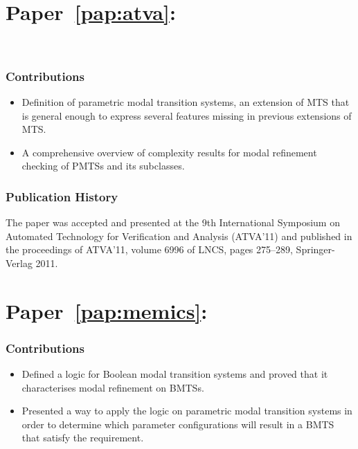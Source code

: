 \newpage

\section*{Paper~\ref{pap:atva}: \atva}
\nikola \jan \kim \\ \mhm \jiri
\vspace{3mm}

\noindent

\subsubsection*{Contributions}

\begin{itemize}
\item Definition of parametric modal transition systems, an extension of MTS that is general enough to express several features missing in previous extensions of MTS.
\item A comprehensive overview of complexity results for modal refinement checking of PMTSs and its subclasses.
\end{itemize}

\subsubsection*{Publication History}

The paper was accepted and presented at the 9th International Symposium on Automated Technology for Verification and Analysis (ATVA'11) and published in the proceedings of ATVA'11, volume 6996 of LNCS, pages 275--289, Springer-Verlag 2011.


\newpage

\section*{Paper~\ref{pap:memics}: \memics}
\mhm \kim \liu
\vspace{3mm}

\noindent

\subsubsection*{Contributions}

\begin{itemize}
\item Defined a logic for Boolean modal transition systems and proved that it characterises modal refinement on BMTSs.
\item Presented a way to apply the logic on parametric modal transition systems in order to determine which parameter configurations will result in a BMTS that satisfy the requirement.
\end{itemize}

